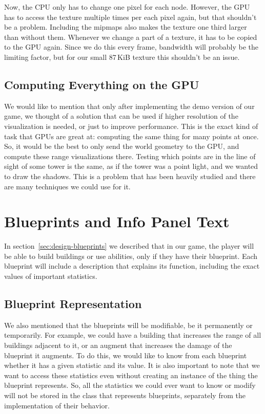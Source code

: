 Now, the CPU only has to change one pixel for each node.
However, the GPU has to access the texture multiple times per each pixel again, but that shouldn't be a problem.
Including the mipmaps also makes the texture one third larger than without them.
Whenever we change a part of a texture, it has to be copied to the GPU again.
Since we do this every frame, bandwidth will probably be the limiting factor, but for our small 87\,KiB texture this shouldn't be an issue.

\subsection{Computing Everything on the GPU}

We would like to mention that only after implementing the demo version of our game, we thought of a solution that can be used if higher resolution of the visualization is needed, or just to improve performance.
This is the exact kind of task that GPUs are great at: computing the same thing for many points at once.
So, it would be the best to only send the world geometry to the GPU, and compute these range visualizations there.
Testing which points are in the line of sight of some tower is the same, as if the tower was a point light, and we wanted to draw the shadows.
This is a problem that has been heavily studied and there are many techniques we could use for it.

\section{Blueprints and Info Panel Text}

In section~\ref{sec:design-blueprints} we described that in our game, the player will be able to build buildings or use abilities, only if they have their blueprint.
Each blueprint will include a description that explains its function, including the exact values of important statistics.

\subsection{Blueprint Representation}

We also mentioned that the blueprints will be modifiable, be it permanently or temporarily.
For example, we could have a building that increases the range of all buildings adjacent to it, or an augment that increases the damage of the blueprint it augments.
To do this, we would like to know from each blueprint whether it has a given statistic and its value.
It is also important to note that we want to access these statistics even without creating an instance of the thing the blueprint represents.
So, all the statistics we could ever want to know or modify will not be stored in the class that represents blueprints, separately from the implementation of their behavior.

